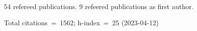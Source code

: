 54 refereed publications. 9 refeered publications as first author.

Total citations~=~1562; h-index~=~25 (2023-04-12)